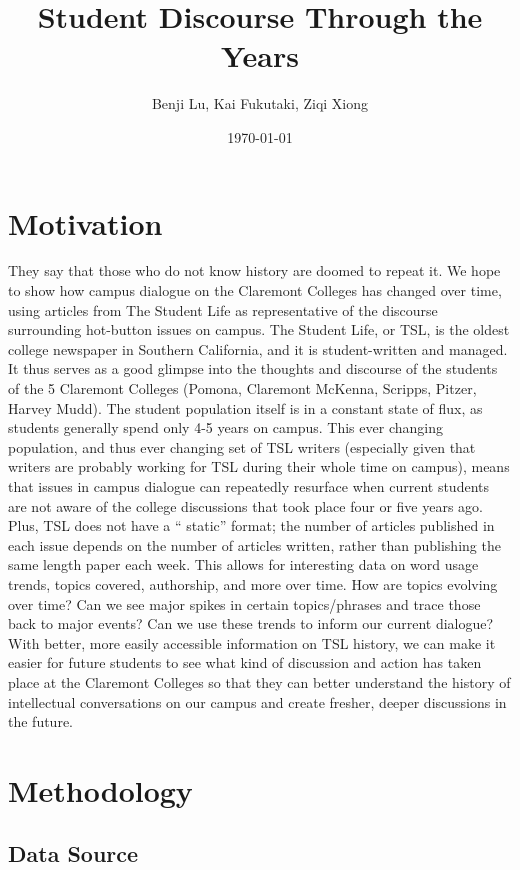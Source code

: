 \documentclass[a4paper]{article}
\title{Student Discourse Through the Years}
\author{Benji Lu, Kai Fukutaki, Ziqi Xiong}
\date{\today}
\begin{document}
\maketitle





\section{Motivation}
They say that those who do not know history are doomed to repeat it. We hope to show how campus dialogue on the Claremont Colleges has changed over time, using articles from The Student Life as representative of the discourse surrounding hot-button issues on campus. The Student Life, or TSL, is the oldest college newspaper in Southern California, and it is student-written and managed. It thus serves as a good glimpse into the thoughts and discourse of the students of the 5 Claremont Colleges (Pomona, Claremont McKenna, Scripps, Pitzer, Harvey Mudd). The student population itself is in a constant state of flux, as students generally spend only 4-5 years on campus. This ever changing population, and thus ever changing set of TSL writers (especially given that writers are probably working for TSL during their whole time on campus), means that issues in campus dialogue can repeatedly resurface when current students are not aware of the college discussions that took place four or five years ago. Plus, TSL does not have a `` static''  format; the number of articles published in each issue depends on the number of articles written, rather than publishing the same length paper each week. This allows for interesting data on word usage trends, topics covered, authorship, and more over time. How are topics evolving over time? Can we see major spikes in certain topics/phrases and trace those back to major events? Can we use these trends to inform our current dialogue? With better, more easily accessible information on TSL history, we can make it easier for future students to see what kind of discussion and action has taken place at the Claremont Colleges so that they can better understand the history of intellectual conversations on our campus and create fresher, deeper discussions in the future.

\section{Methodology}

\subsection{Data Source}
\end{document}
